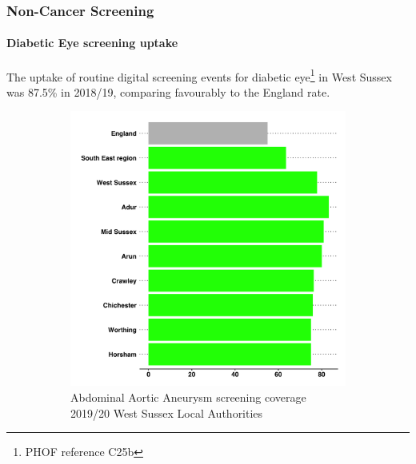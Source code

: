 \subsubsection{Non-Cancer Screening}
\paragraph{Diabetic Eye screening uptake}The uptake of routine digital screening events for diabetic eye\footnote{PHOF reference C25b} in West Sussex was 87.5\% in 2018/19, comparing favourably to the England rate.


\begin{figure}[H]
    \caption[Abdominal Aortic Aneurysm screening coverage]{{\bf Abdominal Aortic Aneurysm screening coverage} The screening coverage rate at county-level for abdominal aortic aneurysm (PHOF reference C25a) was 76.7\% in 2020/21, compared to 55.0\% in England overall.}
    \label{figure:aaa:screening}
    \centering
    \begin{subfigure}[b]{0.49\linewidth}
        \centering
        \includegraphics[width=\linewidth]{images/aaa_rag_bar.png}
        \caption{Abdominal Aortic Aneurysm screening coverage 2019/20 West Sussex Local Authorities}
        \label{fig:aaa:latest}
    \end{subfigure}
    \begin{subfigure}[b]{0.49\linewidth}

\end{subfigure}
\end{figure}
